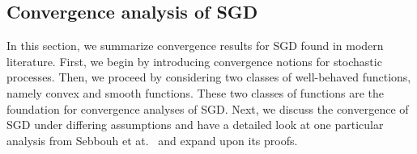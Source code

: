 \documentclass[12pt]{article}
\theoremstyle{definition}
\newtheorem{definition}[definition]{Definition}
\numberwithin{equation}{section}
\newcommand{\R}{\mathbb{R}}
\begin{document}
\subsection{Convergence analysis of SGD}
\label{subsec:convergence_analysis_of_sgd}
In this section, we summarize convergence results for SGD found in modern literature. First, we begin by introducing convergence notions for stochastic processes. Then, we proceed by considering two classes of well-behaved functions, namely convex and smooth functions. These two classes of functions are the foundation for convergence analyses of SGD. Next, we discuss the convergence of SGD under differing assumptions and have a detailed look at one particular analysis from Sebbouh et at.\ \cite{sebbouhAlmostSureConvergence2021} and expand upon its proofs. 
\end{document}
